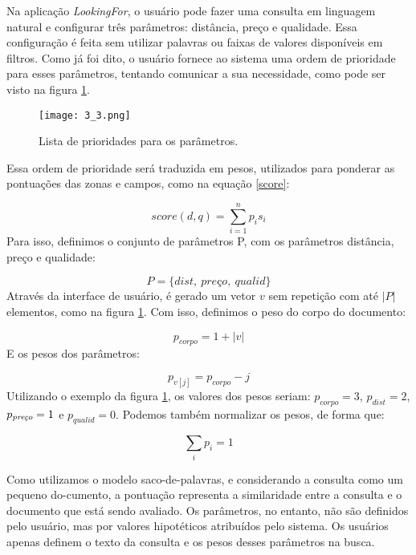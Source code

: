 Na aplicação \emph{LookingFor}, o usuário pode fazer uma consulta em linguagem natural e configurar três parâmetros: distância, preço e qualidade. Essa configuração é feita sem utilizar palavras ou faixas de valores disponíveis em filtros. Como já foi dito, o usuário fornece ao sistema uma ordem de prioridade para esses parâmetros, tentando comunicar a sua necessidade, como pode ser visto na figura \ref{fig:listprior}. 

\begin{figure}[!h]
  \centering
  \texttt{[image: 3\_3.png]} 
  \caption{Lista de prioridades para os parâmetros.}
  \label{fig:listprior} 
\end{figure}

Essa ordem de prioridade será traduzida em pesos, utilizados para ponderar as pontuações das zonas e campos, como na equação \ref{score}:

\begin{displaymath}
	score(d, q) = \sum_{i = 1}^n p_{i} s_{i}
\end{displaymath}
%
Para isso, definimos o conjunto de parâmetros P, com os parâmetros distância, preço e qualidade:

\begin{displaymath}
	P = \{dist,\ \textit{pre\c{c}o}, \ qualid\}
\end{displaymath}
%
Através da interface de usuário, é gerado um vetor $v$ sem repetição com até $|P|$ elementos, como na figura \ref{fig:listprior}. Com isso, definimos o peso do corpo do documento:

\begin{displaymath}
	p_{corpo} = 1 + |v|
\end{displaymath}
%
E os pesos dos parâmetros:

\begin{displaymath}
	p_{v[j]} = p_{corpo} - j
\end{displaymath}
%
Utilizando o exemplo da figura \ref{fig:listprior}, os valores dos pesos seriam: $p_{corpo}=3$, $p_{dist}=2$, $p_{\textit{\scriptsize pre\c{c}o}}=1$ e $p_{qualid}=0$. Podemos também normalizar os pesos, de forma que:

\begin{displaymath}
	\sum_{i} p_{i} = 1
\end{displaymath}

Como utilizamos o modelo saco-de-palavras, e considerando a consulta como um pequeno do-cumento, a pontuação representa a similaridade entre a consulta e o documento que está sendo avaliado. Os parâmetros, no entanto, não são definidos pelo usuário, mas por valores hipotéticos atribuídos pelo sistema. Os usuários apenas definem o texto da consulta e os pesos desses parâmetros na busca.

